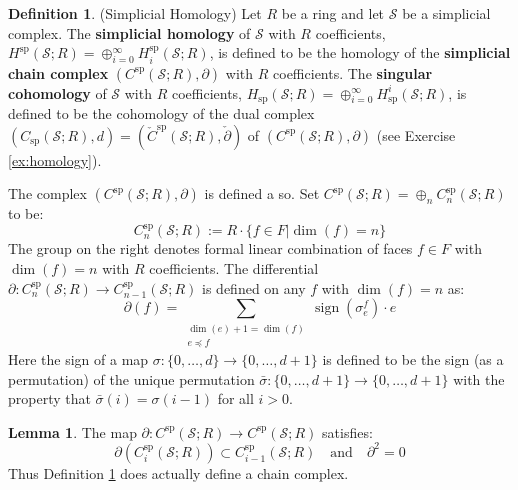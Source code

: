 \documentclass[12pt]{article}
\theoremstyle{definition}
\newtheorem{definition}[theorem]{Definition}
\numberwithin{equation}{section}
\newtheorem{lemma}[theorem]{Lemma}
\newcommand{\op}{\operatorname}
\begin{document}
\begin{definition} \label{def:simplicial_homology} (Simplicial Homology) Let $R$ be a ring and let $\mathcal{S}$ be a simplicial complex. The {\bf simplicial homology} of $\mathcal{S}$ with $R$ coefficients, $H^{\op{sp}}(\mathcal{S};R) = \oplus_{i=0}^\infty H^{\op{sp}}_i(\mathcal{S};R)$, is defined to be the homology of the {\bf simplicial chain complex} $(C^{\op{sp}}(\mathcal{S};R), \partial)$ with $R$ coefficients. The {\bf singular cohomology} of $\mathcal{S}$ with $R$ coefficients, $H_{\op{sp}}(\mathcal{S};R) = \oplus_{i=0}^\infty H_{\op{sp}}^i(\mathcal{S};R)$, is defined to be the cohomology of the dual complex $(C_{\op{sp}}(\mathcal{S};R),d) = (\check{C}^{\op{sp}}(\mathcal{S};R),\check{\partial})$ of $(C^{\op{sp}}(\mathcal{S};R),\partial)$ (see Exercise \ref{ex:homology}).

The complex $(C^{\op{sp}}(\mathcal{S};R),\partial)$ is defined a so. Set $C^{\op{sp}}(\mathcal{S};R) = \oplus_n C_n^{\op{sp}}(\mathcal{S};R)$ to be:
\[
C_n^{\op{sp}}(\mathcal{S};R) := R \cdot \{f \in F|\op{dim}(f) = n\}
\]
The group on the right denotes formal linear combination of faces $f \in F$ with $\op{dim}(f) = n$ with $R$ coefficients. The differential $\partial:C^{\op{sp}}_n(\mathcal{S};R) \to C^{\op{sp}}_{n-1}(\mathcal{S};R)$ is defined on any $f$ with $\op{dim}(f) = n$ as:
\[
\partial(f) = \sum_{\substack{\op{dim}(e) + 1 = \op{dim}(f)\\ e \preccurlyeq f}} \op{sign}(\sigma^f_e) \cdot e
\]
Here the sign of a map $\sigma:\{0,\dots,d\}\to \{0,\dots,d+1\}$ is defined to be the sign (as a permutation) of the unique permutation $\bar{\sigma}:\{0,\dots,d+1\} \to \{0,\dots,d+1\}$ with the property that $\bar{\sigma}(i) = \sigma(i-1)$ for all $i > 0$.
\end{definition}

\begin{lemma} \label{lem:simplicial_d2_zero} The map $\partial:C^{\op{sp}}(\mathcal{S};R) \to C^{\op{sp}}(\mathcal{S};R)$ satisfies:
\[
\partial(C^{\op{sp}}_i(\mathcal{S};R)) \subset C^{\op{sp}}_{i-1}(\mathcal{S};R) \quad \text{and} \quad \partial^2 = 0
\]
Thus Definition \ref{def:simplicial_homology} does actually define a chain complex. 
\end{lemma}
\end{document}
